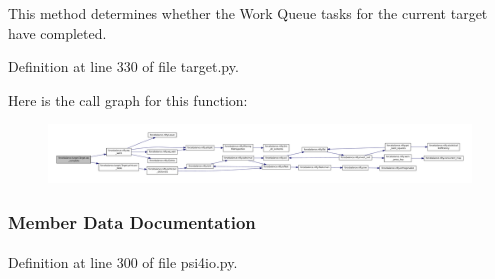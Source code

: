 \-This method determines whether the \-Work \-Queue tasks for the current target have completed. 



\-Definition at line 330 of file target.\-py.



\-Here is the call graph for this function\-:\nopagebreak
\begin{figure}[H]
\begin{center}
\leavevmode
\includegraphics[width=350pt]{classforcebalance_1_1target_1_1Target_af6099ec09486213869dba2491bd8ea04_cgraph}
\end{center}
\end{figure}




\subsubsection{\-Member \-Data \-Documentation}
\hypertarget{classforcebalance_1_1psi4io_1_1RDVR3__Psi4_a00806559809d8530de8733239a0b42d3}{
\paragraph[{callderivs}]{}}\label{classforcebalance_1_1psi4io_1_1RDVR3__Psi4_a00806559809d8530de8733239a0b42d3}


\-Definition at line 300 of file psi4io.\-py.

\hypertarget{classforcebalance_1_1psi4io_1_1RDVR3__Psi4_ab845843d020ffd78521b595625fa56ef}{
\paragraph[{elements}]{}}\label{classforcebalance_1_1psi4io_1_1RDVR3__Psi4_ab845843d020ffd78521b595625fa56ef}


